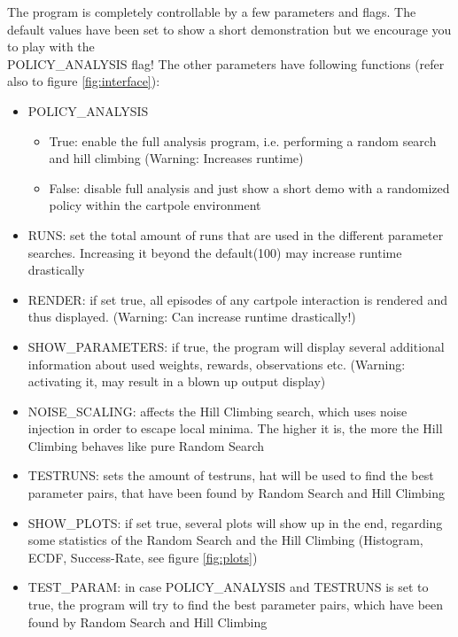 \documentclass[a4paper, 11pt]{article}
\begin{document}
The program is completely controllable by a few parameters and flags. The default values have been set to show a short demonstration but we encourage you to play with the\\
 POLICY\_ANALYSIS flag! The other parameters have following functions (refer also to figure \ref{fig:interface}):
\begin{itemize}
	\item POLICY\_ANALYSIS
	\begin{itemize}
		\item True: enable the full analysis program, i.e. performing a random search and hill climbing (Warning: Increases runtime)
		\item False: disable full analysis and just show a short demo with a randomized policy within the cartpole environment
	\end{itemize}
	\item RUNS: set the total amount of runs that are used in the different parameter searches. Increasing it beyond the default(100) may increase runtime drastically
	\item RENDER: if set true, all episodes of any cartpole interaction is rendered and thus displayed. (Warning: Can increase runtime drastically!)
	\item SHOW\_PARAMETERS: if true, the program will display several additional information about used weights, rewards, observations etc. (Warning: activating it, may result in a blown up output display)
	\item NOISE\_SCALING: affects the Hill Climbing search, which uses noise injection in order to escape local minima. The higher it is, the more the Hill Climbing behaves like pure Random Search
	\item TESTRUNS: sets the amount of testruns, hat will be used to find the best parameter pairs, that have been found by Random Search and Hill Climbing
	\item SHOW\_PLOTS: if set true, several plots will show up in the end, regarding some statistics of the Random Search and the Hill Climbing (Histogram, ECDF, Success-Rate, see figure \ref{fig:plots})
	\item TEST\_PARAM: in case POLICY\_ANALYSIS and TESTRUNS is set to true, the program will try to find the best parameter pairs, which have been found by Random Search and Hill Climbing
\end{itemize}
\end{document}
